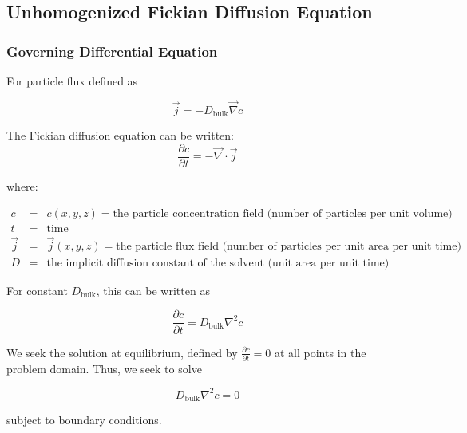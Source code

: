 
\subsection{Unhomogenized Fickian Diffusion Equation}\label{subsec:unhom_fick}

\subsubsection{Governing Differential Equation}\label{subsubsec:unhom_fick_gov}
For particle flux defined as 

\begin{equation}
\vec{j} = - D_{\mathrm{bulk}} \vec{\nabla} c
\end{equation}

The Fickian diffusion equation can be written:
\begin{equation}
\frac{\partial c}{\partial t} = - \vec{\nabla} \cdot \vec{j}
\end{equation}

where:

$\begin{array}{rcl}
c & = & c(x,y,z) = \text{the particle concentration field (number of particles per unit volume)} \\
t & = & \text{time} \\
\vec{j} & = & \vec{j}(x,y,z) = \text{the particle flux field (number of particles per unit area per unit time)} \\
D & = & \text{the implicit diffusion constant of the solvent (unit area per unit time)}
\end{array}$

For constant $D_{\mathrm{bulk}}$, this can be written as

\begin{equation}
\frac{\partial c}{\partial t} = D_{\mathrm{bulk}} \nabla^2 c
\end{equation}

We seek the solution at equilibrium, defined by
$\frac{\partial c}{\partial t} = 0$ at all points in the problem domain.
Thus, we seek to solve

\begin{equation}
D_{\mathrm{bulk}} \nabla^2 c = 0
\end{equation}

subject to boundary conditions.

